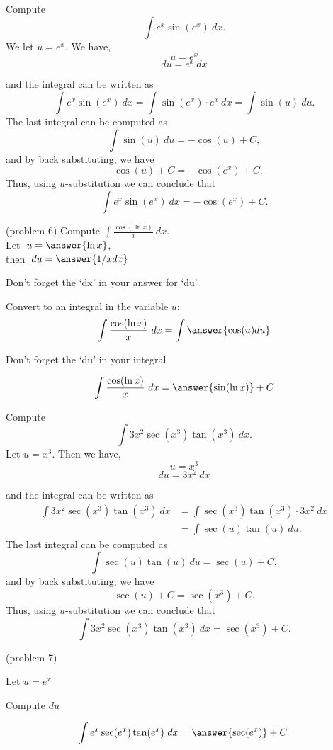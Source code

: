 \documentclass[handout]{ximera}
\begin{document}
\begin{example}[example 6] Compute 
\[\int e^x\sin(e^x) \ dx.\]
We let $u = e^x$.  We have,
\[u = e^x\]
\[du = e^x \ dx\]

and the integral can be written as 
\[\int e^x\sin(e^x) \ dx = \int \sin(e^x) \cdot e^x \  dx = \int \sin(u) \ du.\]
The last integral can be computed as 
\[\int \sin(u) \ du = -\cos(u) + C,\]
and by back substituting, we have 
\[-\cos(u) + C = -\cos(e^x) + C.\]
Thus, using $u$-substitution we can conclude that
\[\int e^x\sin(e^x) \ dx =  -\cos(e^x) + C.\]
\end{example}




\begin{problem}(problem 6)
\hspace{.2 in} Compute $\displaystyle{\int \frac{\cos(\ln x)}{x} \ dx}$.\\
Let $\;u = \answer{\ln x}$, \\
then $\;du = \answer{1/x dx}$\\
\begin{hint}
Don't forget the `dx' in your answer for `du'
\end{hint}
Convert to an integral in the variable $u$:
\[\int \frac{\cos(\ln x)}{x} \ dx = \int\answer{\cos(u) du}\]
\begin{hint}
Don't forget the `du' in your integral
\end{hint}

\[\int \frac{\cos(\ln x)}{x} \ dx = \answer{\sin(\ln x)} +C\]
\end{problem}


\begin{example}[example 7] Compute 
\[\int 3x^2\sec(x^3)\tan(x^3) \ dx.\]
Let $u = x^3$.  Then we have,
\[u = x^3\]
\[du = 3x^2 \ dx\]

and the integral can be written as 
\begin{align*}
\int 3x^2\sec(x^3)\tan(x^3) \ dx &= \int \sec(x^3)\tan(x^3) \cdot 3x^2 \ dx\\
&= \int \sec(u)\tan(u) \ du.
\end{align*}
The last integral can be computed as 
\[\int \sec(u)\tan(u) \ du = \sec(u) + C,\]
and by back substituting, we have 
\[\sec(u) + C = \sec(x^3) + C.\]
Thus, using $u$-substitution we can conclude that
\[\int 3x^2\sec(x^3)\tan(x^3) \ dx =  \sec(x^3) + C.\]
\end{example}

\begin{problem}(problem 7)
\begin{hint}
Let $u = e^x$
\end{hint}
\begin{hint}
Compute $du$
\end{hint}
\[\int e^x\sec(e^x)\tan(e^x) \ dx = \answer{\sec(e^x)} +C.\]
\end{problem}
\end{document}
